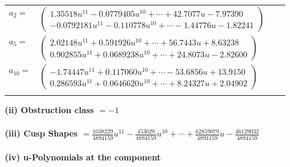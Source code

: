 \documentclass[1p]{elsarticle_modified}
\theoremstyle{definition}
\begin{document}
\begin{tabular}{m{7pt} m{180pt} m{7pt} m{180pt} }
\flushright $a_{2}=$&$\begin{pmatrix}1.35518 u^{11}-0.0779405 u^{10}+\cdots+42.7077 u-7.97390\\-0.0792181 u^{11}-0.110778 u^{10}+\cdots-1.44776 u-1.82241\end{pmatrix}$ \\
\flushright $a_{5}=$&$\begin{pmatrix}2.02148 u^{11}+0.591926 u^{10}+\cdots+56.7443 u+8.63238\\0.902855 u^{11}+0.0689238 u^{10}+\cdots+24.8073 u-2.82600\end{pmatrix}$ \\
\flushright $a_{10}=$&$\begin{pmatrix}-1.74447 u^{11}+0.117060 u^{10}+\cdots-53.6856 u+13.9150\\0.286593 u^{11}+0.0646620 u^{10}+\cdots+8.24327 u+2.04902\end{pmatrix}$\\&\end{tabular}
\flushleft \textbf{(ii) Obstruction class $= -1$}\\~\\
\flushleft \textbf{(iii) Cusp Shapes $= \frac{1038229}{4894159} u^{11}-\frac{453029}{4894159} u^{10}+\cdots+\frac{62859079}{4894159} u-\frac{46129032}{4894159}$}\\~\\
\newpage\renewcommand{\arraystretch}{1}
\flushleft \textbf{(iv) u-Polynomials at the component}\newline \\
\end{document}
